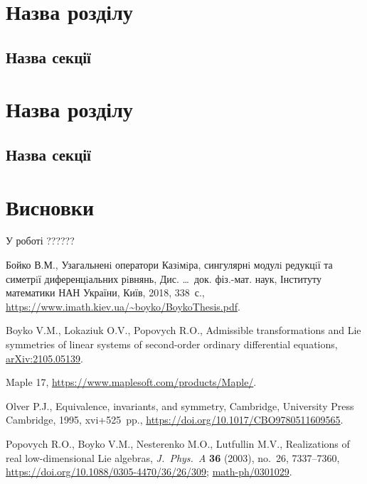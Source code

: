 \documentclass{thesis}
\begin{document}
\newpage

\chapter{Назва розділу}\label{chaper1}

\section{Назва секції}\label{section1.1}

\newpage

\chapter{Назва розділу}\label{chaper2}

\section{Назва секції}\label{section2.1}


\newpage

\chapter*{Висновки}

У роботі ??????

\newpage

\renewcommand{\bibname}{Список використаних джерел}

\begin{thebibliography}{99}
\itemsep=0pt

Бойко В.М.,
Узагальненi оператори Казiмiра,
сингулярнi модулi редукцiї
та симетрiї диференцiальних рiвнянь,
Дис. \dots\ док. фіз.-мат. наук,  Інституту математики НАН України, Київ, 2018, 338~с., \url{https://www.imath.kiev.ua/~boyko/BoykoThesis.pdf}.



Boyko V.M., Lokaziuk O.V., Popovych R.O.,
Admissible transformations and Lie symmetries of linear systems of second-order ordinary differential equations, \href{https://arxiv.org/abs/2105.05139}{arXiv:2105.05139}.

Maple 17, \url{https://www.maplesoft.com/products/Maple/}.


Olver P.J., Equivalence, invariants, and symmetry, Cambridge, University Press Cambridge, 1995, xvi+525~pp.,
\url{https://doi.org/10.1017/CBO9780511609565}.


Popovych R.O., Boyko V.M., Nesterenko M.O., Lutfullin M.V., Realizations of real low-dimensional Lie algebras, \textit{J.~Phys.~A} \textbf{36} (2003), no.~26,
7337--7360, \url{https://doi.org/10.1088/0305-4470/36/26/309}; \href{https://arxiv.org/abs/math-ph/0301029}{math-ph/0301029}.



\end{thebibliography}
\end{document}
